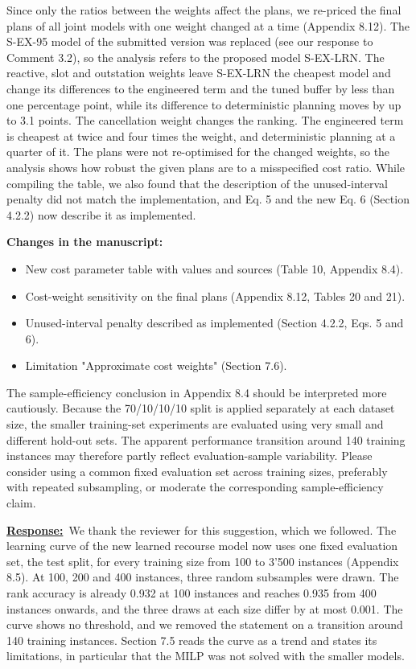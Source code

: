 \documentclass{article}
\newcommand{\response}{\vspace{0.1cm}\noindent\underline{\textbf{Response:}}\ }
\newcommand{\changes}{\vspace{0.1cm}\noindent\textbf{Changes in the manuscript:}}
\begin{document}
Since only the ratios between the weights affect the plans, we re-priced the final plans of all joint models with one weight changed at a time (Appendix 8.12). The S-EX-95 model of the submitted version was replaced (see our response to Comment 3.2), so the analysis refers to the proposed model S-EX-LRN. The reactive, slot and outstation weights leave S-EX-LRN the cheapest model and change its differences to the engineered term and the tuned buffer by less than one percentage point, while its difference to deterministic planning moves by up to 3.1 points. The cancellation weight changes the ranking. The engineered term is cheapest at twice and four times the weight, and deterministic planning at a quarter of it. The plans were not re-optimised for the changed weights, so the analysis shows how robust the given plans are to a misspecified cost ratio. While compiling the table, we also found that the description of the unused-interval penalty did not match the implementation, and Eq. 5 and the new Eq. 6 (Section 4.2.2) now describe it as implemented.

\changes
\begin{itemize}[nosep]
\item New cost parameter table with values and sources (Table 10, Appendix 8.4).
\item Cost-weight sensitivity on the final plans (Appendix 8.12, Tables 20 and 21).
\item Unused-interval penalty described as implemented (Section 4.2.2, Eqs. 5 and 6).
\item Limitation "Approximate cost weights" (Section 7.6).
\end{itemize}

\begin{cmt}{}{}
The sample-efficiency conclusion in Appendix 8.4 should be interpreted more cautiously. Because the 70/10/10/10 split is applied separately at each dataset size, the smaller training-set experiments are evaluated using very small and different hold-out sets. The apparent performance transition around 140 training instances may therefore partly reflect evaluation-sample variability. Please consider using a common fixed evaluation set across training sizes, preferably with repeated subsampling, or moderate the corresponding sample-efficiency claim.
\end{cmt}

\response We thank the reviewer for this suggestion, which we followed. The learning curve of the new learned recourse model now uses one fixed evaluation set, the test split, for every training size from 100 to 3{'}500 instances (Appendix 8.5). At 100, 200 and 400 instances, three random subsamples were drawn. The rank accuracy is already 0.932 at 100 instances and reaches 0.935 from 400 instances onwards, and the three draws at each size differ by at most 0.001. The curve shows no threshold, and we removed the statement on a transition around 140 training instances. Section 7.5 reads the curve as a trend and states its limitations, in particular that the MILP was not solved with the smaller models.
\end{document}
